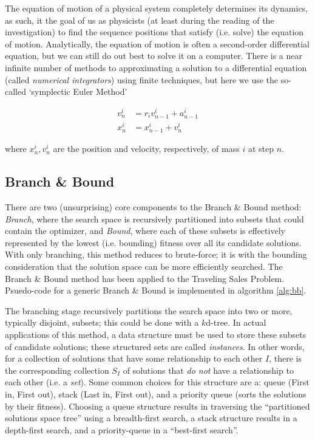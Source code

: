 \documentclass{article}
\begin{document}
            The equation of motion of a physical system completely determines its dynamics, as such, it the goal of us as physicists (at least during the reading of the investigation) to find the sequence positions that satisfy (i.e. solve) the equation of motion.  Analytically, the equation of motion is often a second-order differential equation, but we can still do out best to solve it on a computer.  There is a near infinite number of methods to approximating a solution to a differential equation (called \emph{numerical integrators}) using finite techniques, but here we use the so-called `symplectic Euler Method'

            \begin{align}
                v_n^i &= r_i v_{n-1}^i + a_{n - 1}^i \\
                x_n^i &= x_{n - 1}^i + v_n^i
            \end{align}

            where $x_n^i, v_n^i$ are the position and velocity, respectively, of mass $i$ at step $n$.

        \subsection*{Branch \& Bound}

            There are two (unsurprising) core components to the Branch \& Bound method: \emph{Branch}, where the search space is recursively partitioned into subsets that could contain the optimizer, and \emph{Bound}, where each of these subsets is effectively represented by the lowest (i.e. bounding) fitness over all its candidate solutions.  With only branching, this method reduces to brute-force;  it is with the bounding consideration that the solution space can be more efficiently searched.  The Branch \& Bound method has been applied to the Traveling Sales Problem\cite{branch_bound}.  Psuedo-code for a generic Branch \& Bound is implemented in algorithm \ref{alg:bb}.

            The branching stage recursively partitions the search space into two or more, typically disjoint, subsets; this could be done with a $k$d-tree.  In actual applications of this method, a data structure must be used to store these subsets of candidate solutions; these structured sets are called \emph{instances}.  In other words, for a collection of solutions that have some relationship to each other $I$, there is the corresponding collection $S_I$ of solutions that \emph{do not} have a relationship to each other (i.e. a \emph{set}).  Some common choices for this structure are a: queue (First in, First out), stack (Last in, First out), and a priority queue (sorts the solutions by their fitness)\cite{Clausen2003BranchAB}.  Choosing a queue structure results in traversing the ``partitioned solutions space tree'' using a breadth-first search, a stack structure results in a depth-first search, and a priority-queue in a ``best-first search''\cite{toolbox}.
\end{document}

